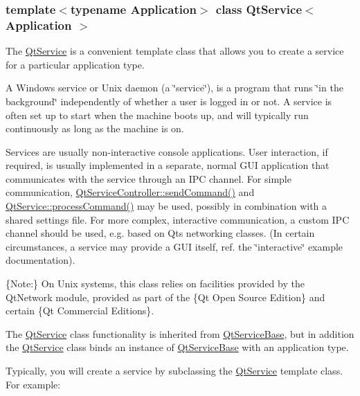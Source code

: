 \subsubsection*{template$<$typename Application$>$\newline
class Qt\+Service$<$ Application $>$}

The \mbox{\hyperlink{class_qt_service}{Qt\+Service}} is a convenient template class that allows you to create a service for a particular application type. 

A Windows service or Unix daemon (a \char`\"{}service\char`\"{}), is a program that runs \char`\"{}in the background\char`\"{} independently of whether a user is logged in or not. A service is often set up to start when the machine boots up, and will typically run continuously as long as the machine is on.

Services are usually non-\/interactive console applications. User interaction, if required, is usually implemented in a separate, normal G\+UI application that communicates with the service through an I\+PC channel. For simple communication, \mbox{\hyperlink{class_qt_service_controller_a1428c7d51403416bc7663ae37c446cfc}{Qt\+Service\+Controller\+::send\+Command()}} and \mbox{\hyperlink{class_qt_service_base_a47485f00f6eba0758d2ffc75092295cf}{Qt\+Service\+::process\+Command()}} may be used, possibly in combination with a shared settings file. For more complex, interactive communication, a custom I\+PC channel should be used, e.\+g. based on Qt\textquotesingle{}s networking classes. (In certain circumstances, a service may provide a G\+UI itself, ref. the \char`\"{}interactive\char`\"{} example documentation).

\{Note\+:\} On Unix systems, this class relies on facilities provided by the Qt\+Network module, provided as part of the \{Qt Open Source Edition\} and certain \{Qt Commercial Editions\}.

The \mbox{\hyperlink{class_qt_service}{Qt\+Service}} class functionality is inherited from \mbox{\hyperlink{class_qt_service_base}{Qt\+Service\+Base}}, but in addition the \mbox{\hyperlink{class_qt_service}{Qt\+Service}} class binds an instance of \mbox{\hyperlink{class_qt_service_base}{Qt\+Service\+Base}} with an application type.

Typically, you will create a service by subclassing the \mbox{\hyperlink{class_qt_service}{Qt\+Service}} template class. For example\+:


